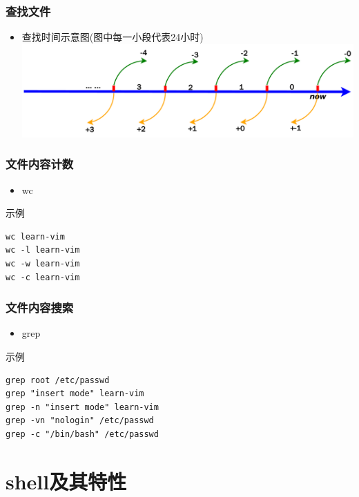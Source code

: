 \documentclass[xcolor=svgnames,presentation]{beamer}
\begin{document}
\begin{frame}
\frametitle{查找文件}
\label{sec-1-1-9}
\begin{itemize}

\item 查找时间示意图(图中每一小段代表24小时)\\
\label{sec-1-1-9-1}%
\includegraphics[width=.9\linewidth]{img/find-time.pdf}
\end{itemize} %
\end{frame}
\begin{frame}[fragile]
\frametitle{文件内容计数}
\label{sec-1-1-10}
\begin{itemize}

\item wc
\label{sec-1-1-10-1}%
\end{itemize} %
\begin{exampleblock}{示例}
\label{sec-1-1-10-2}


\begin{verbatim}
wc learn-vim
wc -l learn-vim
wc -w learn-vim
wc -c learn-vim
\end{verbatim}
\end{exampleblock}
\end{frame}
\begin{frame}[fragile]
\frametitle{文件内容搜索}
\label{sec-1-1-11}
\begin{itemize}

\item grep
\label{sec-1-1-11-1}%
\end{itemize} %
\begin{exampleblock}{示例}
\label{sec-1-1-11-2}


\begin{verbatim}
grep root /etc/passwd
grep "insert mode" learn-vim
grep -n "insert mode" learn-vim
grep -vn "nologin" /etc/passwd
grep -c "/bin/bash" /etc/passwd
\end{verbatim}
\end{exampleblock}
\end{frame}
\section{shell及其特性}
\label{sec-2}
\end{document}
